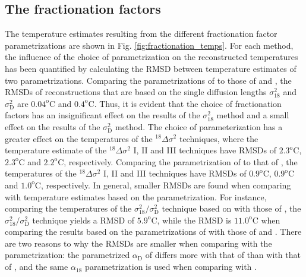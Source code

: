 \documentclass[11pt, draftcls, onecolumn]{IEEEtran} %
\numberwithin{equation}{section}
\numberwithin{table}{section}
\numberwithin{figure}{section}
\begin{document}
\subsection{The fractionation factors} \label{sec:fractionation}
The temperature estimates resulting from the different fractionation factor parametrizations
are shown in Fig. \ref{fig:fractionation_temps}. 
For each method, the influence of the choice of parametrization on the reconstructed
temperatures has been quantified by calculating the RMSD between temperature estimates of two parametrizations.
Comparing the parametrizations of \citet{Ellehoj2013} to those of \citet{Majoube1971} and \citet{Merlivat1967},
the RMSDs of reconstructions that are based on the single diffusion lengths $\sigma^2_{18}$ and $\sigma^2_{\mathrm{D}}$ are
$0.04^\mathrm{o}\mathrm{C}$ and $0.4^\mathrm{o}\mathrm{C}$.
Thus, it is evident that the choice of fractionation factors has an insignificant effect
on the results of the $\sigma^2_{18}$ method and a small effect on the results of the $\sigma^2_{\mathrm{D}}$ method.
The choice of parameterization has a greater effect on the temperatures of the ${}^{18}\Delta\sigma^2$ techniques,
where the temperature estimate of the ${}^{18}\Delta\sigma^2$ I, II and III techniques have RMSDs of 
$2.3^\mathrm{o}\mathrm{C}$, $2.3^\mathrm{o}\mathrm{C}$ and $2.2^\mathrm{o}\mathrm{C}$, respectively.
Comparing the parametrization of \citet{Lamb2015} to that of \citet{Merlivat1967},
the temperatures of the ${}^{18}\Delta\sigma^2$ I, II and III techniques have RMSDs of 
$0.9^\mathrm{o}\mathrm{C}$, $0.9^\mathrm{o}\mathrm{C}$ and $1.0^\mathrm{o}\mathrm{C}$, respectively.
In general, smaller RMSDs are found when comparing with temperature estimates based on the \citet{Lamb2015} parametrization.
For instance, comparing the temperatures of the ${\sigma^2_{18}}/{\sigma^2_\mathrm{D}}$ technique based on \citet{Lamb2015} with those of \citet{Merlivat1967},
the ${\sigma^2_{18}}/{\sigma^2_\mathrm{D}}$ technique yields a RMSD of $5.9^\mathrm{o}\mathrm{C}$,
while the RMSD is $11.0^\mathrm{o}\mathrm{C}$ when comparing the results based on the parametrizations of
\citet{Ellehoj2013} with those of \citet{Majoube1971} and \citet{Merlivat1967}.
There are two reasons to why the RMSDs are smaller when comparing with the \citet{Lamb2015} parametrization:
the parametrized $\alpha_\mathrm{D}$ of \citet{Merlivat1967} differs more with that of \citet{Ellehoj2013} than with that of \citet{Lamb2015},
and the same $\alpha_{18}$ parametrization is used when comparing with \citet{Lamb2015}.
\end{document}
